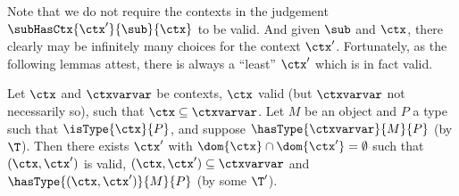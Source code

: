 Note that we do not require the contexts in the judgement $\subHasCtx{\ctx'}{\sub}{\ctx}$ to be valid.
And given $\sub$ and $\ctx$, there clearly may be infinitely many choices for the context $\ctx'$.
Fortunately, as the following lemmas attest, there is always a ``least'' $\ctx'$ which is in fact valid.

\begin{lemma}
\label{lem:minimal-codomain-object}
Let $\ctx$ and $\ctxvarvar$ be contexts, $\ctx$ valid (but $\ctxvarvar$ not necessarily so), such that $\ctx \subseteq \ctxvarvar$.
Let $M$ be an object and $P$ a type such that $\isType{\ctx}{P}$, and suppose $\hasType{\ctxvarvar}{M}{P}$ (by $\T$).
Then there exists $\ctx'$ with $\dom{\ctx} \cap \dom{\ctx'} = \emptyset$ such that $(\ctx, \ctx')$ is valid, $(\ctx, \ctx') \subseteq \ctxvarvar$ and $\hasType{(\ctx, \ctx')}{M}{P}$ (by some $\T'$).
\end{lemma}

